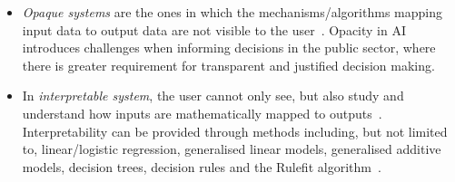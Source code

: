 \begin{itemize}

\item \emph{Opaque systems} are the ones in which the mechanisms/algorithms mapping input data to output data are not visible to the user~\cite{doran17}.
  Opacity in AI introduces challenges when informing
  decisions in the public sector, where there is greater requirement
  for transparent and justified decision making.


\item In \emph{interpretable system}, the user cannot only see, but also study and understand how inputs are mathematically mapped to outputs~\cite{doran17}.
Interpretability can be provided through methods including, but not limited to, linear/logistic regression, generalised linear models, generalised additive models, decision trees, decision rules and the Rulefit algorithm~\cite{Molnar20}.


\end{itemize}

